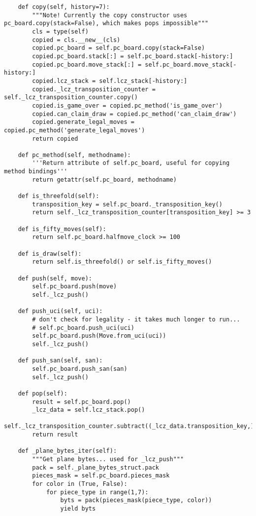 \begin{verbatim}
    def copy(self, history=7):
        """Note! Currently the copy constructor uses pc_board.copy(stack=False), which makes pops impossible"""
        cls = type(self)
        copied = cls.__new__(cls)
        copied.pc_board = self.pc_board.copy(stack=False)
        copied.pc_board.stack[:] = self.pc_board.stack[-history:]
        copied.pc_board.move_stack[:] = self.pc_board.move_stack[-history:]
        copied.lcz_stack = self.lcz_stack[-history:]
        copied._lcz_transposition_counter = self._lcz_transposition_counter.copy()
        copied.is_game_over = copied.pc_method('is_game_over')
        copied.can_claim_draw = copied.pc_method('can_claim_draw')
        copied.generate_legal_moves = copied.pc_method('generate_legal_moves')        
        return copied

    def pc_method(self, methodname):
        '''Return attribute of self.pc_board, useful for copying method bindings'''
        return getattr(self.pc_board, methodname)
    
    def is_threefold(self):
        transposition_key = self.pc_board._transposition_key()
        return self._lcz_transposition_counter[transposition_key] >= 3
    
    def is_fifty_moves(self):
        return self.pc_board.halfmove_clock >= 100
    
    def is_draw(self):
        return self.is_threefold() or self.is_fifty_moves()

    def push(self, move):
        self.pc_board.push(move)
        self._lcz_push()

    def push_uci(self, uci):
        # don't check for legality - it takes much longer to run...
        # self.pc_board.push_uci(uci)
        self.pc_board.push(Move.from_uci(uci))
        self._lcz_push()

    def push_san(self, san):
        self.pc_board.push_san(san)
        self._lcz_push()

    def pop(self):
        result = self.pc_board.pop()
        _lcz_data = self.lcz_stack.pop()
        self._lcz_transposition_counter.subtract((_lcz_data.transposition_key,))
        return result

    def _plane_bytes_iter(self):
        """Get plane bytes... used for _lcz_push"""
        pack = self._plane_bytes_struct.pack
        pieces_mask = self.pc_board.pieces_mask
        for color in (True, False):
            for piece_type in range(1,7):
                byts = pack(pieces_mask(piece_type, color))
                yield byts


\end{verbatim}
